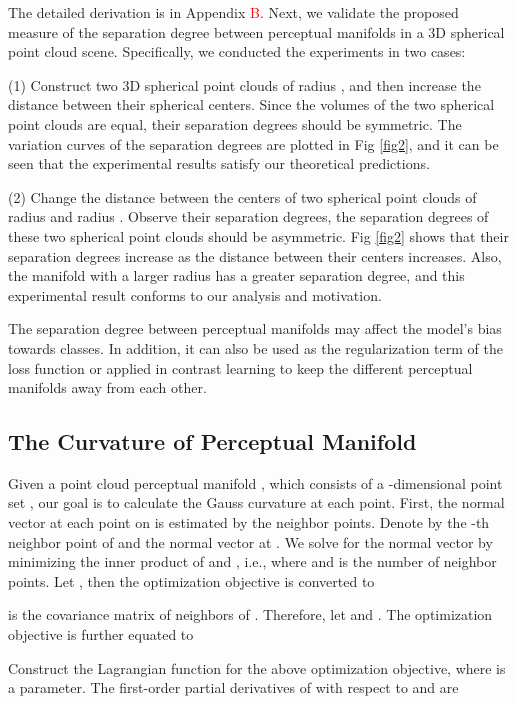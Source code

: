 \documentclass[10pt,twocolumn,letterpaper]{article}
\begin{document}
The detailed derivation is in Appendix \textcolor{red}{B}. Next, we validate the proposed measure of the separation degree between perceptual manifolds in a 3D spherical point cloud scene. Specifically, we conducted the experiments in two cases: 

(1) Construct two 3D spherical point clouds of radius , and then increase the distance between their spherical centers. Since the volumes of the two spherical point clouds are equal, their separation degrees should be symmetric. The variation curves of the separation degrees are plotted in Fig \ref{fig2}, and it can be seen that the experimental results satisfy our theoretical predictions.

(2) Change the distance between the centers of two spherical point clouds of radius  and radius . Observe their separation degrees, the separation degrees of these two spherical point clouds should be asymmetric. Fig \ref{fig2} shows that their separation degrees increase as the distance between their centers increases. Also, the manifold with a larger radius has a greater separation degree, and this experimental result conforms to our analysis and motivation.

The separation degree between perceptual manifolds may affect the model's bias towards classes. In addition, it can also be used as the regularization term of the loss function or applied in contrast learning to keep the different perceptual manifolds away from each other.

\subsection{The Curvature of Perceptual Manifold}
\label{sec3.4}

Given a point cloud perceptual manifold , which consists of a -dimensional point set , our goal is to calculate the Gauss curvature at each point. First, the normal vector at each point on  is estimated by the neighbor points. Denote by  the -th neighbor point of  and  the normal vector at . We solve for the normal vector by minimizing the inner product of  and  \cite{paper53}, i.e.,  where  and  is the number of neighbor points. Let , then the optimization objective is converted to

 is the covariance matrix of  neighbors of . Therefore, let  and . The optimization objective is further equated to

Construct the Lagrangian function  for the above optimization objective, where  is a parameter. The first-order partial derivatives of  with respect to  and  are
\end{document}
